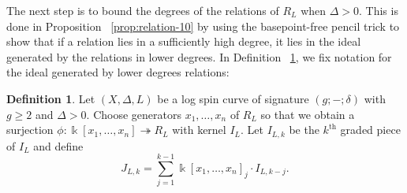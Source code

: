 \documentclass{amsart}
\theoremstyle{plain}
\theoremstyle{definition}
\newtheorem{defn}[thm]{Definition}
\theoremstyle{remark}
\numberwithin{equation}{section}
\newcommand\Bk{{\Bbbk}}
\DeclareMathOperator{\sym}{Sym}
\newcommand{\halfcan}{L}
\begin{document}
%

The next step is to bound the degrees of the relations of $R_\halfcan$ when $\Delta > 0$. This is done in Proposition ~\ref{prop:relation-10}
by using the basepoint-free pencil trick to show that if a relation lies in a sufficiently high degree, it lies in the ideal generated by the relations in lower degrees.  In Definition ~\ref{defn:lower-ideal}, we fix notation for the ideal generated by lower degrees relations:

\begin{defn}
\label{defn:lower-ideal}
Let $(X, \Delta, L)$ be a log spin curve of signature $(g; -; \delta
)$ with $g \geq 2$ and $\Delta > 0.$ Choose generators $x_1, \ldots
, x_n$ of $R_\halfcan$ so that we obtain a surjection $\phi: \Bk[x_1, \ldots
, x_n] \twoheadrightarrow R_\halfcan$ with kernel $I_\halfcan$. Let $I_{\halfcan, k}$ be
the $k^\text{th}$ graded piece of $I_\halfcan$ and define
\[
	J_{\halfcan,k} = \sum_{j = 1}^{k - 1}\Bk[x_1, \ldots, x_n]_j \cdot I_{\halfcan,k-j}.
\]
\end{defn}
\end{document}
